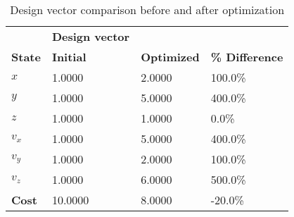 \begin{table}[]
\centering
\begin{tabular}{llll}
\textbf{}      & \cellcolor[HTML]{EFEFEF}\textbf{Design vector} & \textbf{}          & \textbf{}             \\
\rowcolor[HTML]{EFEFEF} 
\textbf{State} & \textbf{Initial}                               & \textbf{Optimized} & \textbf{\% Difference} \\
$x$ & 1.0000 & 2.0000 & 100.0\% \\ 
$y$ & 1.0000 & 5.0000 & 400.0\% \\ 
$z$ & 1.0000 & 1.0000 & 0.0\% \\ 
$v_{x}$ & 1.0000 & 5.0000 & 400.0\% \\ 
$v_{y}$ & 1.0000 & 2.0000 & 100.0\% \\ 
$v_{z}$ & 1.0000 & 6.0000 & 500.0\% \\ 
\rowcolor[HTML]{EFEFEF} 
\textbf{Cost}  & 10.0000 & 8.0000 & -20.0\% \\ 
\end{tabular}
\caption{Design vector comparison before and after optimization}
\label{tab:DesignVectorOptimization}
\end{table}